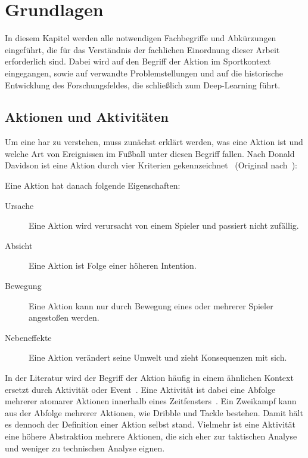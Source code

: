 \chapter{Grundlagen}
\label{ch:basics}

In diesem Kapitel werden alle notwendigen Fachbegriffe und Abkürzungen eingeführt, die für das Verständnis der fachlichen Einordnung dieser Arbeit erforderlich sind.
Dabei wird auf den Begriff der Aktion im Sportkontext eingegangen, sowie auf verwandte Problemstellungen und auf die historische Entwicklung des Forschungsfeldes, die schließlich zum Deep-Learning führt.

\section{Aktionen und Aktivitäten}
\label{sec:aktionen-und-aktivitaeten}

Um eine \gls{har} zu verstehen, muss zunächst erklärt werden, was eine Aktion ist und welche Art von Ereignissen im Fußball unter diesen Begriff fallen.
Nach Donald Davidson ist eine Aktion durch vier Kriterien gekennzeichnet~\cite{Chen14} (Original nach~\cite{Davidson63}):


Eine Aktion hat danach folgende Eigenschaften:
\begin{description}
    \item[Ursache] Eine Aktion wird verursacht von einem Spieler und passiert nicht zufällig.
    \item[Absicht] Eine Aktion ist Folge einer höheren Intention.
    \item[Bewegung] Eine Aktion kann nur durch Bewegung eines oder mehrerer Spieler angestoßen werden.
    \item[Nebeneffekte] Eine Aktion verändert seine Umwelt und zieht Konsequenzen mit sich.
\end{description}

In der Literatur wird der Begriff der Aktion häufig in einem ähnlichen Kontext ersetzt durch Aktivität oder Event~\cite{Giancola18}.
Eine Aktivität ist dabei eine Abfolge mehrerer atomarer Aktionen innerhalb eines Zeitfensters~\cite{Dai17}.
Ein Zweikampf kann \zB aus der Abfolge mehrerer Aktionen, wie Dribble und Tackle bestehen.
Damit hält es dennoch der Definition einer Aktion selbst stand.
Vielmehr ist eine Aktivität eine höhere Abstraktion mehrere Aktionen, die sich eher zur taktischen Analyse und weniger zu technischen Analyse eignen.

